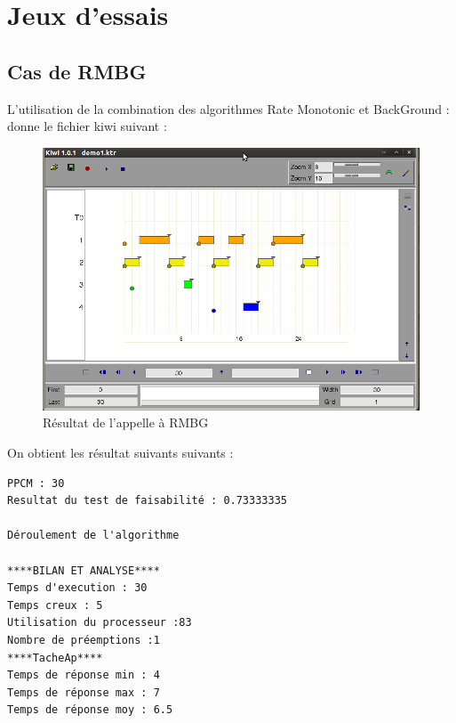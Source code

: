 \chapter{Jeux d'essais}
\section{Cas de RMBG}
L'utilisation de la combination des algorithmes Rate Monotonic et BackGround : donne  le fichier kiwi suivant : 
\begin{figure}[htbp]
  \centering
  \includegraphics[scale=0.60]{img/RMBG}
  \caption{Résultat de l'appelle à RMBG}
  \label{fig:RMBG}
\end{figure}
On obtient les résultat suivants suivants : 
\begin{verbatim}
PPCM : 30
Resultat du test de faisabilité : 0.73333335

Déroulement de l'algorithme

****BILAN ET ANALYSE****
Temps d'execution : 30
Temps creux : 5
Utilisation du processeur :83
Nombre de préemptions :1
****TacheAp****
Temps de réponse min : 4
Temps de réponse max : 7
Temps de réponse moy : 6.5
\end{verbatim}
